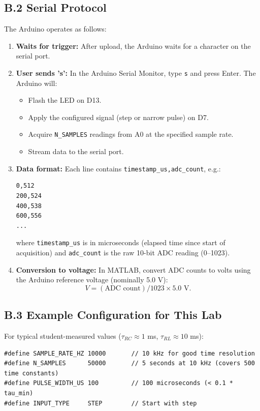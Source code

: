 \documentclass[11pt,letterpaper]{article}
\begin{document}
\subsection*{B.2 Serial Protocol}

The Arduino operates as follows:

\begin{enumerate}
    \item \textbf{Waits for trigger:} After upload, the Arduino waits for a character on the serial port.

    \item \textbf{User sends 's':} In the Arduino Serial Monitor, type \texttt{s} and press Enter. The Arduino will:
    \begin{itemize}
        \item Flash the LED on D13.
        \item Apply the configured signal (step or narrow pulse) on D7.
        \item Acquire \texttt{N\_SAMPLES} readings from A0 at the specified sample rate.
        \item Stream data to the serial port.
    \end{itemize}

    \item \textbf{Data format:} Each line contains \texttt{timestamp\_us,adc\_count}, e.g.:
    \begin{verbatim}
0,512
200,524
400,538
600,556
...
    \end{verbatim}
    where \texttt{timestamp\_us} is in microseconds (elapsed time since start of acquisition) and \texttt{adc\_count} is the raw 10-bit ADC reading (0--1023).

    \item \textbf{Conversion to voltage:} In MATLAB, convert ADC counts to volts using the Arduino reference voltage (nominally 5.0 V):
    \begin{equation}
    V = (\text{ADC count}) / 1023 \times 5.0 \text{ V}.
    \end{equation}
\end{enumerate}

\subsection*{B.3 Example Configuration for This Lab}

For typical student-measured values ($\tau_{RC} \approx 1$ ms, $\tau_{RL} \approx 10$ ms):

\begin{verbatim}
#define SAMPLE_RATE_HZ 10000       // 10 kHz for good time resolution
#define N_SAMPLES      50000       // 5 seconds at 10 kHz (covers 500 time constants)
#define PULSE_WIDTH_US 100         // 100 microseconds (< 0.1 * tau_min)
#define INPUT_TYPE     STEP        // Start with step
\end{verbatim}
\end{document}
